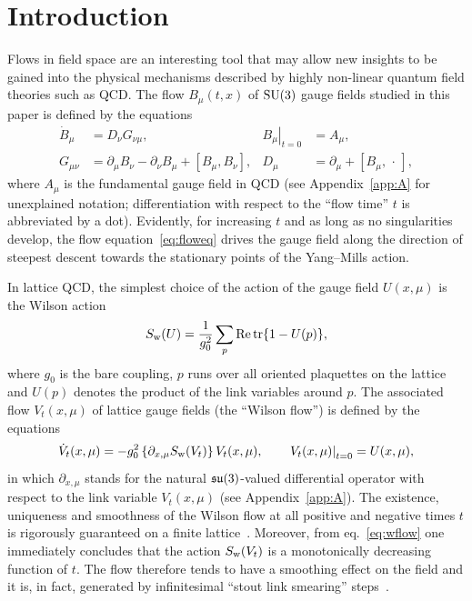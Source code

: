 \section{Introduction}

Flows in field space are an interesting tool that may
allow new insights to be gained into the physical
mechanisms described
by highly non-linear quantum field theories such as QCD.
The flow $B_{\mu}(t,x)$ of $\mathrm{SU(3)}$ gauge fields
studied in this paper is
defined by the equations
\begin{align}
  \dot{B}_{\mu} &= D_{\nu}G_{\nu\mu},
  &
  \left.B_{\mu}\right|_{t=0} &= A_{\mu},
  \label{eq:floweq}\\
  G_{\mu\nu} &= \partial_{\mu}B_{\nu}-\partial_{\nu}B_{\mu}
  +[B_{\mu},B_{\nu}],
  &
  D_{\mu} &= \partial_{\mu}+[B_{\mu},\,\cdot\,],
\end{align}
where $A_{\mu}$ is the fundamental gauge field in QCD
(see Appendix~\ref{app:A} for unexplained notation; differentiation with
respect to the ``flow time'' $t$ is abbreviated by a dot).
Evidently, for increasing $t$ and as long as no singularities
develop, the flow equation~\eqref{eq:floweq} drives the gauge field
along the direction of steepest descent towards the
stationary points of the Yang--Mills action.

In lattice QCD, the simplest choice of the action
of the gauge field $U(x,\mu)$ is the Wilson action~\cite{Wilson}
\begin{equation}
  S_{\mathrm{w}}(U)=\frac{1}{g_0^2}\sum_p
  \mathrm{Re}\,\mathrm{tr}\{1-U(p)\},
  \label{eq:wact}
\end{equation}
where $g_0$ is the bare coupling,
$p$ runs over all oriented plaquettes on the lattice
and $U(p)$ denotes the product of
the link variables around $p$.
The associated flow $V_t(x,\mu)$ of
lattice gauge fields (the ``Wilson flow'')
is defined by the equations
\begin{equation}
  \dot{V}_t(x,\mu)=-g_0^2\left\{\partial_{x,\mu}S_{\mathrm{w}}(V_t)\right\}V_t(x,\mu),
  \qquad
  \left.V_t(x,\mu)\right|_{t=0}=U(x,\mu),
  \label{eq:wflow}
\end{equation}
in which $\partial_{x,\mu}$ stands for the natural $\mathfrak{su}(3)$-valued
differential operator with respect to the
link variable $V_t(x,\mu)$ (see Appendix~\ref{app:A}).
The existence, uniqueness and smoothness of the Wilson flow at
all positive and negative times $t$ is rigorously guaranteed on
a finite lattice~\cite{ArnoldI}. Moreover, from eq.~\eqref{eq:wflow}
one immediately concludes that
the action $S_{\mathrm{w}}(V_t)$ is a monotonically decreasing function of $t$.
The flow therefore tends to have a smoothing
effect on the field and it is, in fact, generated by infinitesimal
``stout link smearing'' steps~\cite{Stout}.


